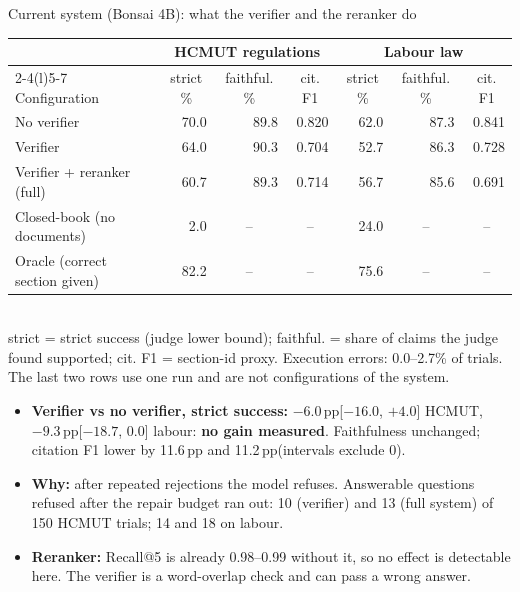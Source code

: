 \documentclass[aspectratio=1610,11pt]{beamer}
\newcommand{\pp}{\,pp\xspace}
\newcommand{\cell}[1]{\multicolumn{1}{c}{#1}}
\begin{document}
\begin{frame}{Current system (Bonsai 4B): what the verifier and the reranker do}
  \footnotesize
  \centering
  \begin{tabular}{@{}l rrr@{\hskip 1.6em} rrr@{}}
    \toprule & \multicolumn{3}{c}{HCMUT regulations} & \multicolumn{3}{c}{Labour law}\\
    \cmidrule(r){2-4}\cmidrule(l){5-7}
    Configuration & \cell{strict \%} & \cell{faithful. \%} & \cell{cit. F1} & \cell{strict \%} & \cell{faithful. \%} & \cell{cit. F1}\\\midrule
    No verifier & 70.0 & 89.8 & 0.820 & 62.0 & 87.3 & 0.841\\
    Verifier & 64.0 & 90.3 & 0.704 & 52.7 & 86.3 & 0.728\\
    Verifier + reranker (full) & 60.7 & 89.3 & 0.714 & 56.7 & 85.6 & 0.691\\\midrule
    Closed-book (no documents) & 2.0 & \cell{--} & \cell{--} & 24.0 & \cell{--} & \cell{--}\\
    Oracle (correct section given) & 82.2 & \cell{--} & \cell{--} & 75.6 & \cell{--} & \cell{--}\\
    \bottomrule
  \end{tabular}\\[2pt]
  {\scriptsize strict = strict success (judge lower bound); faithful. = share of claims the judge found supported; cit. F1 = section-id proxy. Execution errors: 0.0--2.7\% of trials. The last two rows use one run and are not configurations of the system.}
  \vspace{6pt}

  \raggedright
  \begin{itemize}
    \item \textbf{Verifier vs no verifier, strict success:} $-6.0$\pp [$-16.0$, $+4.0$] HCMUT, $-9.3$\pp [$-18.7$, $0.0$] labour: \textbf{no gain measured}. Faithfulness unchanged; citation F1 lower by 11.6\pp and 11.2\pp (intervals exclude 0).
    \item \textbf{Why:} after repeated rejections the model refuses. Answerable questions refused after the repair budget ran out: 10 (verifier) and 13 (full system) of 150 HCMUT trials; 14 and 18 on labour.
    \item \textbf{Reranker:} Recall@5 is already 0.98--0.99 without it, so no effect is detectable here. The verifier is a word-overlap check and can pass a wrong answer.
  \end{itemize}
\end{frame}
\end{document}
